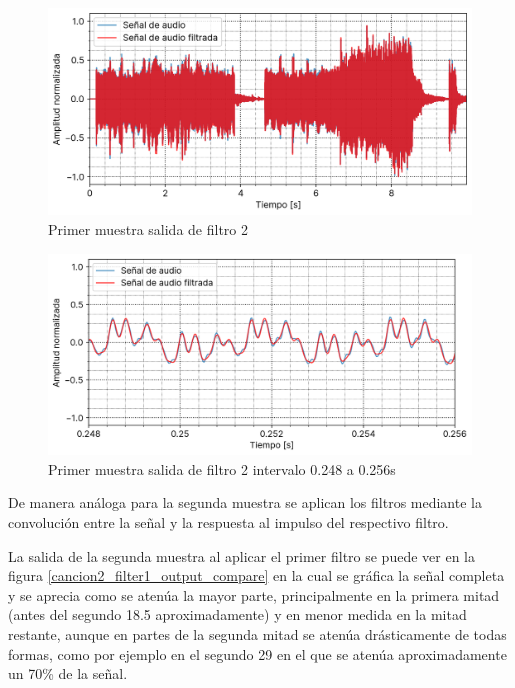 \documentclass[12pt]{article}
\begin{document}
\begin{figure}[H]
\centering
\includegraphics{plot/cancion1_filter2_output_compare.png}
\caption{Primer muestra salida de filtro 2}
\label{cancion1_filter2_output_compare}
\end{figure}

\begin{figure}[H]
\centering
\includegraphics{plot/cancion1_filter2_output_compare_0_248_a_0_256.png}
\caption{Primer muestra salida de filtro 2 intervalo 0.248 a 0.256s}
\label{cancion1_filter2_output_compare_0_248_a_0_256}
\end{figure}

De manera análoga para la segunda muestra se aplican los filtros mediante la
convolución entre la señal y la respuesta al impulso del respectivo filtro.

La salida de la segunda muestra al aplicar el primer filtro se puede ver en la
figura \ref{cancion2_filter1_output_compare} en la cual se gráfica la señal
completa y se aprecia como se atenúa la mayor parte, principalmente en la
primera mitad (antes del segundo 18.5 aproximadamente) y en menor medida en
la mitad restante, aunque en partes de la segunda mitad se atenúa drásticamente
de todas formas, como por ejemplo en el segundo 29 en el que se atenúa
aproximadamente un 70\% de la señal.
\end{document}
